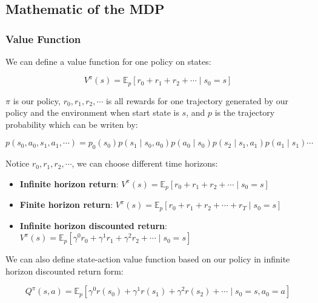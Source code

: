\documentclass[11pt]{article}
\begin{document}
\subsection{Mathematic of the MDP}

\subsubsection{Value Function}

We can define a value function for one policy on states:

\begin{equation}
V^{\pi}(s)=\mathbb{E}_{p}\left[r_{0}+r_{1}+r_{2}+\cdots \mid s_{0}=s\right]
\end{equation}

$\pi$ is our policy, $r_{0}, r_{1}, r_{2}, \cdots$ is all rewards for one trajectory generated by our policy and the environment when start state is $s$, and $p$ is the trajectory probability which can be writen by:

\begin{equation}
p\left(s_{0}, a_{0}, s_{1}, a_{1}, \cdots\right)=p_{0}\left(s_{0}\right) p\left(s_{1} \mid s_{0}, a_{0}\right) p\left(a_{0} \mid s_{0}\right) p\left(s_{2} \mid s_{1}, a_{1}\right) p\left(a_{1} \mid s_{1}\right) \cdots
\end{equation}

Notice $r_{0}, r_{1}, r_{2}, \cdots$, we can choose different time horizons:
\begin{itemize}
\item  \textbf{Infinite horizon return}: $V^{\pi}(s)=\mathbb{E}_{p}\left[r_{0}+r_{1}+r_{2}+\cdots \mid s_{0}=s\right]$
\item  \textbf{Finite horizon return}: $V^{\pi}(s)=\mathbb{E}_{p}\left[r_{0}+r_{1}+r_{2}+\cdots+r_{T} \mid s_{0}=s\right]$
\item  \textbf{Infinite horizon discounted return}: $V^{\pi}(s)=\mathbb{E}_{p}\left[\gamma^{0} r_{0}+\gamma^{1} r_{1}+\gamma^{2} r_{2}+\cdots \mid s_{0}=s\right]$

\end{itemize}


We can also define state-action value function based on our policy in infinite horizon discounted return form:

\begin{equation}
Q^{\pi}(s, a)=\mathbb{E}_{p}\left[\gamma^{0} r\left(s_{0}\right)+\gamma^{1} r\left(s_{1}\right)+\gamma^{2} r\left(s_{2}\right)+\cdots \mid s_{0}=s, a_{0}=a\right] 
\end{equation}
\end{document}
